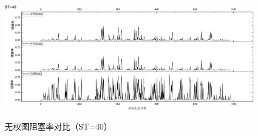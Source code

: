 \begin{figure}
\setlength{\abovecaptionskip}{-0.5cm}
\begin{center}
{\includegraphics[width=1 \textwidth]{figures/B40Z.pdf}}
\end{center}
\caption{{\footnotesize{无权图阻塞率对比（ST=40）}}}
\label{B40Z}
\end{figure}


